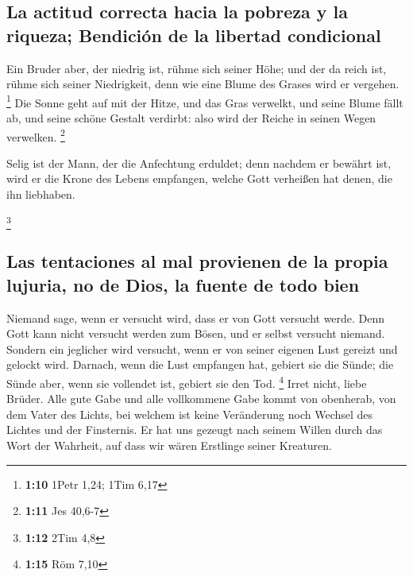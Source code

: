 \hypertarget{la-actitud-correcta-hacia-la-pobreza-y-la-riqueza-bendiciuxf3n-de-la-libertad-condicional}{%
\subsection{La actitud correcta hacia la pobreza y la riqueza; Bendición
de la libertad
condicional}\label{la-actitud-correcta-hacia-la-pobreza-y-la-riqueza-bendiciuxf3n-de-la-libertad-condicional}}

 Ein Bruder aber, der niedrig ist, rühme sich seiner Höhe;
 und der da reich ist, rühme sich seiner Niedrigkeit,
denn wie eine Blume des Grases wird er vergehen. \footnote{\textbf{1:10}
  1Petr 1,24; 1Tim 6,17}  Die Sonne geht auf mit der
Hitze, und das Gras verwelkt, und seine Blume fällt ab, und seine schöne
Gestalt verdirbt: also wird der Reiche in seinen Wegen verwelken.
\footnote{\textbf{1:11} Jes 40,6-7}

 Selig ist der Mann, der die Anfechtung erduldet; denn
nachdem er bewährt ist, wird er die Krone des Lebens empfangen, welche
Gott verheißen hat denen, die ihn liebhaben.

\footnote{\textbf{1:12} 2Tim 4,8}

\hypertarget{las-tentaciones-al-mal-provienen-de-la-propia-lujuria-no-de-dios-la-fuente-de-todo-bien}{%
\subsection{Las tentaciones al mal provienen de la propia lujuria, no de
Dios, la fuente de todo
bien}\label{las-tentaciones-al-mal-provienen-de-la-propia-lujuria-no-de-dios-la-fuente-de-todo-bien}}

 Niemand sage, wenn er versucht wird, dass er von Gott
versucht werde. Denn Gott kann nicht versucht werden zum Bösen, und er
selbst versucht niemand.  Sondern ein jeglicher wird
versucht, wenn er von seiner eigenen Lust gereizt und gelockt wird.
 Darnach, wenn die Lust empfangen hat, gebiert sie die
Sünde; die Sünde aber, wenn sie vollendet ist, gebiert sie den Tod.
\footnote{\textbf{1:15} Röm 7,10}  Irret nicht, liebe
Brüder.  Alle gute Gabe und alle vollkommene Gabe kommt
von obenherab, von dem Vater des Lichts, bei welchem ist keine
Veränderung noch Wechsel des Lichtes und der Finsternis. 
Er hat uns gezeugt nach seinem Willen durch das Wort der Wahrheit, auf
dass wir wären Erstlinge seiner Kreaturen.

